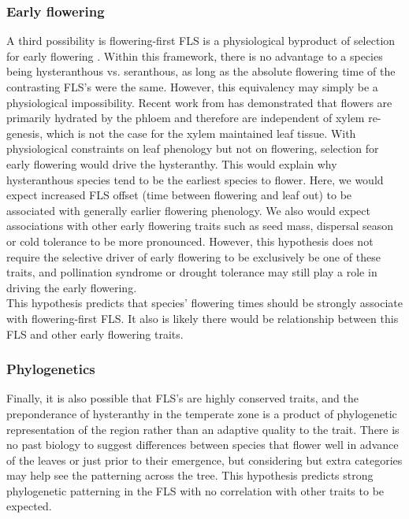 \documentclass[12pt]{article}\usepackage[]{graphicx}\usepackage[]{color}
\begin{document}
\subsubsection*{Early flowering}
\indent\indent A third possibility is flowering-first FLS is a physiological byproduct of selection for early flowering \citep{Primack1987}. %
Within this framework, there is no advantage to a species being hysteranthous vs. seranthous, as long as the absolute flowering time of the contrasting FLS's were the same. However, this equivalency may simply be a physiological impossibility. Recent work from \citet{Savage2019} has demonstrated that flowers are primarily hydrated by the phloem and therefore are independent of xylem re-genesis, which is not the case for the xylem maintained leaf tissue. With physiological constraints on leaf phenology but not on flowering, selection for early flowering would drive the hysteranthy. This would explain why hysteranthous species tend to be the earliest species to flower. Here, we would expect increased FLS offset (time between flowering and leaf out) to be associated with generally earlier flowering phenology. We also would expect associations with other early flowering traits such as seed mass, dispersal season or cold tolerance to be more pronounced. However, this hypothesis does not require the selective driver of early flowering to be exclusively be one of these traits, and pollination syndrome or drought tolerance may still play a role in driving the early flowering.\\
\indent This hypothesis predicts that species' flowering times should be strongly associate with flowering-first FLS. It also is likely there would be relationship between this FLS and other early flowering traits.
\subsubsection*{Phylogenetics} 
\indent\indent Finally, it is also possible that FLS's are highly conserved traits, and the preponderance of hysteranthy in the temperate zone is a product of phylogenetic representation of the region rather than an adaptive quality to the trait. There is no past biology to suggest differences between species that flower well in advance of the leaves or just prior to their emergence, but considering but extra categories may help see the patterning across the tree. This hypothesis predicts strong phylogenetic patterning in the FLS with no correlation with other traits to be expected.\\
\end{document}
